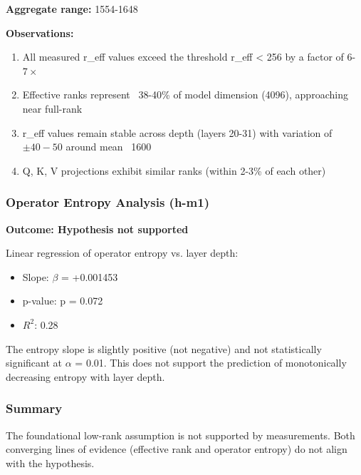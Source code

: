 \textbf{Aggregate range:} 1554-1648

\textbf{Observations:}

\begin{enumerate}
\item All measured r\_eff values exceed the threshold r\_eff < 256 by a factor of 6-$7\times$
\item Effective ranks represent ~38-40\% of model dimension (4096), approaching near full-rank
\item r\_eff values remain stable across depth (layers 20-31) with variation of $\pm 40-50$ around mean ~1600
\item Q, K, V projections exhibit similar ranks (within 2-3\% of each other)
\end{enumerate}

\subsubsection{Operator Entropy Analysis (h-m1)}

\textbf{Outcome: Hypothesis not supported}

Linear regression of operator entropy vs. layer depth:
\begin{itemize}
\item Slope: $\beta$ = +0.001453
\item p-value: p = 0.072
\item $R^2$: 0.28
\end{itemize}

The entropy slope is slightly positive (not negative) and not statistically significant at $\alpha$ = 0.01. This does not support the prediction of monotonically decreasing entropy with layer depth.

\subsubsection{Summary}

\begin{table}[htbp]
\centering
{}
\end{table}

The foundational low-rank assumption is not supported by measurements. Both converging lines of evidence (effective rank and operator entropy) do not align with the hypothesis.
